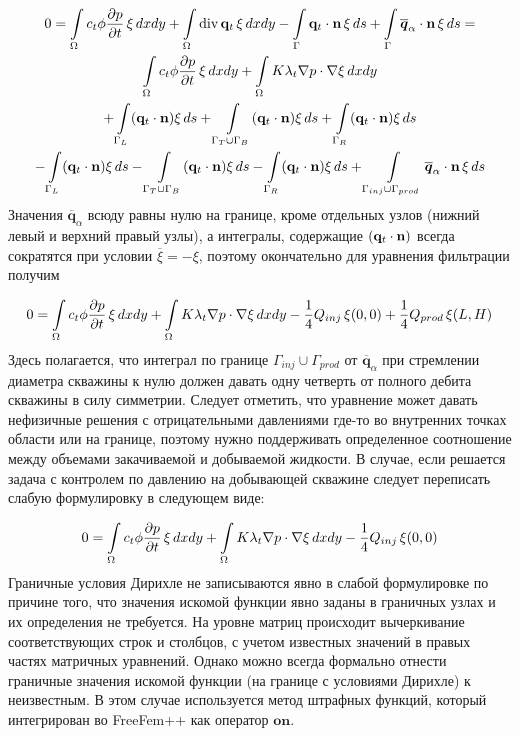 \begin{multline}
	\displaystyle 0=\int\limits_\Omega c_t\phi \dfrac{\partial p}{\partial t}\, \xi \,dx dy 
	 + \int\limits_\Omega \operatorname{div}{\mathbf{q}_t}\, \xi \,dx dy
	 - \int\limits_{\Gamma} \mathbf{q}_t\cdot \mathbf{n} \, \xi \,ds 
	 + \int\limits_{\Gamma} \overline{\bm{q}}_{\alpha}\cdot \mathbf{n} \, \xi \,ds = \\ 
	 \int\limits_\Omega c_t\phi \dfrac{\partial p}{\partial t}\, \xi \,dx dy 
	 + \int\limits_\Omega K \lambda_t \nabla p \cdot \nabla\xi \,dx dy \\
	 +\int\limits_{\Gamma_L} (\mathbf{q}_t \cdot \mathbf{n}) \xi \, ds
	 +\int\limits_{\Gamma_T\cup \Gamma_B} (\mathbf{q}_t \cdot \mathbf{n}) \xi \, ds
	 +\int\limits_{\Gamma_R} (\mathbf{q}_t \cdot \mathbf{n}) \xi \, ds \\
	 -\int\limits_{\Gamma_L} (\mathbf{q}_t \cdot \mathbf{n}) \xi \, ds
	 -\int\limits_{\Gamma_T\cup \Gamma_B} (\mathbf{q}_t \cdot \mathbf{n}) \xi \, ds
	 -\int\limits_{\Gamma_R} (\mathbf{q}_t \cdot \mathbf{n}) \xi \, ds 
	 +\int\limits_{\Gamma_{inj}\cup \Gamma_{prod}} \overline{\bm{q}}_{\alpha}\cdot \mathbf{n} \, \xi \, ds\\ 
\end{multline}
Значения $\overline{\bm{q}}_{\alpha}$ всюду равны нулю на границе, кроме отдельных узлов (нижний левый и верхний правый узлы), а интегралы, содержащие $(\mathbf{q}_t \cdot \mathbf{n})$ всегда сократятся
при условии $\overline{\xi} = -\xi$, поэтому окончательно для уравнения фильтрации получим

\begin{equation}\label{eq:PressureNeuman}
	0=\int\limits_\Omega c_t\phi \dfrac{\partial p}{\partial t}\, \xi \,dx dy 
	+ \int\limits_\Omega K \lambda_t \nabla p \cdot \nabla\xi \,dx dy - \frac{1}{4}Q_{inj}\, \xi(0,0)
	+ \frac{1}{4}Q_{prod}\, \xi(L,H)
\end{equation}
Здесь полагается, что интеграл по границе $\Gamma_{inj}\cup \Gamma_{prod}$ от $\overline{\bm{q}}_{\alpha}$ 
при стремлении диаметра скважины к нулю должен давать одну четверть от полного дебита скважины в силу симметрии.
Следует отметить, что уравнение  может давать нефизичные решения с 
отрицательными давлениями где-то во внутренних точках области или на границе, поэтому нужно
поддерживать определенное соотношение между объемами закачиваемой и добываемой жидкости.
В случае, если решается задача с контролем по давлению на добывающей скважине следует переписать
слабую формулировку в следующем виде:

\begin{equation}\label{eq:PressureDirichlet}
	0=\int\limits_\Omega c_t\phi \dfrac{\partial p}{\partial t}\, \xi \,dx dy 
	+ \int\limits_\Omega K \lambda_t \nabla p \cdot \nabla\xi \,dx dy - \frac{1}{4}Q_{inj}\, \xi(0,0)
\end{equation}
Граничные условия Дирихле не записываются явно в слабой формулировке   по причине того, что
значения искомой функции явно заданы в граничных узлах и их определения не требуется. На уровне матриц
происходит вычеркивание соответствующих строк и столбцов, с учетом известных значений в правых
частях матричных уравнений. Однако можно всегда формально отнести граничные значения искомой функции (на границе 
с условиями Дирихле) к неизвестным. В этом случае используется метод штрафных функций, который
интегрирован во FreeFem++ как оператор $\mathbf{on}$. 

